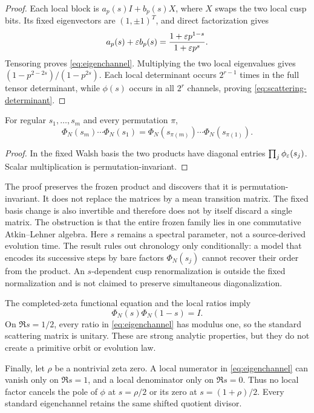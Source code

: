 \begin{proof}
Each local block is \(a_p(s)I+b_p(s)X\), where \(X\) swaps the two local
cusp bits.  Its fixed eigenvectors are \((1,\pm1)^T\), and direct
factorization gives
\[
a_p(s)+\varepsilon b_p(s)
=\frac{1+\varepsilon p^{1-s}}{1+\varepsilon p^s}.
\]
Tensoring proves \cref{eq:eigenchannel}.  Multiplying the two local
eigenvalues gives \((1-p^{2-2s})/(1-p^{2s})\).  Each local determinant occurs
\(2^{r-1}\) times in the full tensor determinant, while \(\phi(s)\) occurs in
all \(2^r\) channels, proving \cref{eq:scattering-determinant}.
\end{proof}

\begin{corollary}
For regular \(s_1,\ldots,s_m\) and every permutation \(\pi\),
\begin{equation}
\Phi_N(s_m)\cdots\Phi_N(s_1)
=\Phi_N(s_{\pi(m)})\cdots\Phi_N(s_{\pi(1)}).
\label{eq:order-blind}
\end{equation}
\end{corollary}

\begin{proof}
In the fixed Walsh basis the two products have diagonal entries
\(\prod_j\phi_\varepsilon(s_j)\).  Scalar multiplication is permutation-invariant.
\end{proof}

The proof preserves the frozen product and discovers that it is
permutation-invariant.  It does not replace the matrices by a mean transition
matrix.  The fixed basis change is also invertible and therefore does not by
itself discard a single matrix.  The obstruction is that the entire frozen
family lies in one commutative Atkin--Lehner algebra.  Here \(s\) remains a
spectral parameter, not a source-derived evolution time.  The result rules
out chronology only conditionally: a model that encodes its successive steps
by bare factors \(\Phi_N(s_j)\) cannot recover their order from the product.
An \(s\)-dependent cusp renormalization is outside the fixed normalization
and is not claimed to preserve simultaneous diagonalization.

The completed-zeta functional equation and the local ratios imply
\[
\Phi_N(s)\Phi_N(1-s)=I.
\]
On \(\Re s=1/2\), every ratio in \cref{eq:eigenchannel} has modulus one, so
the standard scattering matrix is unitary.  These are strong analytic
properties, but they do not create a primitive orbit or evolution law.

Finally, let \(\rho\) be a nontrivial zeta zero.  A local numerator in
\cref{eq:eigenchannel} can vanish only on \(\Re s=1\), and a local denominator
only on \(\Re s=0\).  Thus no local factor cancels the pole of \(\phi\) at
\(s=\rho/2\) or its zero at \(s=(1+\rho)/2\).  Every standard eigenchannel
retains the same shifted quotient divisor.
